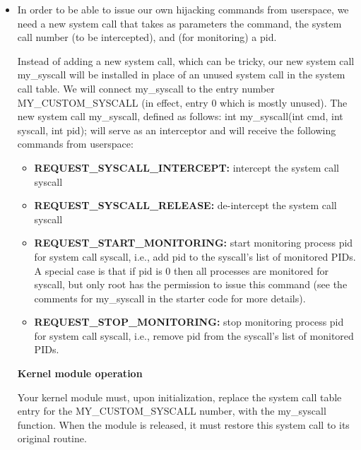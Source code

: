 \documentclass[12pt]{article}
\begin{document}
\begin{itemize}
    \item

    In order to be able to issue our own hijacking commands from userspace, we
    need a new system call that takes as parameters the command, the system call
    number (to be intercepted), and (for monitoring) a pid.

    \bigskip

    Instead of adding a new system call, which can be tricky, our new system call
    my\_syscall will be installed in place of an unused system call in the system
    call table. We will connect my\_syscall to the entry number MY\_CUSTOM\_SYSCALL
    (in effect, entry 0 which is mostly unused). The new system call my\_syscall,
    defined as follows: int my\_syscall(int cmd, int syscall, int pid); will serve
    as an interceptor and will receive the following commands from userspace:

    \bigskip

    \begin{itemize}
        \item \textbf{REQUEST\_SYSCALL\_INTERCEPT:} intercept the system call syscall
        \item \textbf{REQUEST\_SYSCALL\_RELEASE:} de-intercept the system call syscall
        \item \textbf{REQUEST\_START\_MONITORING:} start monitoring process pid for
        system call syscall, i.e., add pid to the syscall's list of monitored PIDs.
        A special case is that if pid is 0 then all processes are monitored for
        syscall, but only root has the permission to issue this command (see the
        comments for my\_syscall in the starter code for more details).
        \item \textbf{REQUEST\_STOP\_MONITORING:} stop monitoring process pid for
        system call syscall, i.e., remove pid from the syscall's list of
        monitored PIDs.
    \end{itemize}

    \bigskip

    \textbf{Kernel module operation}

    \bigskip

    Your kernel module must, upon initialization, replace the system call table
    entry for the MY\_CUSTOM\_SYSCALL number, with the my\_syscall function. When
    the module is released, it must restore this system call to its original routine.

    \bigskip


\end{itemize}
\end{document}
